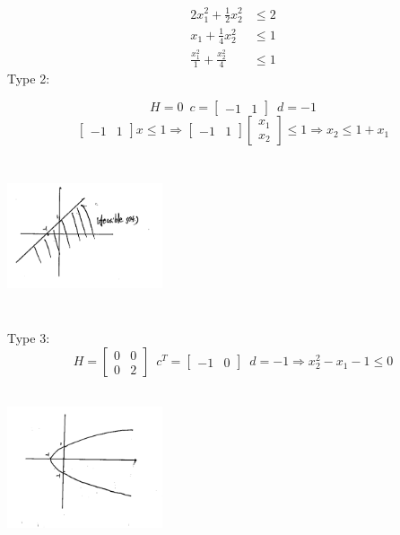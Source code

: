 \begin{align*}
2x_1^2 + \frac{1}{2}x_2^2 &\leq 2\\
x_1 + \frac{1}{4}x_2^2 &\leq 1\\
\frac{x_1^2}{1} + \frac{x_2^2}{4} &\leq 1
\end{align*}
Type 2:

\begin{equation*}
H=0\,\,\,c = \begin{bmatrix}
-1 & 1
\end{bmatrix}\,\,\,
d = -1
\end{equation*}
\begin{equation*}
\begin{bmatrix}
-1 & 1
\end{bmatrix}x\leq 1\Rightarrow
\begin{bmatrix}
-1 & 1
\end{bmatrix}
\begin{bmatrix}
x_1\\
x_2
\end{bmatrix}\leq 1\Rightarrow x_2\leq 1 + x_1
\end{equation*}

\begin{marginfigure}
	\centering
	\includegraphics[width=1.8in,height=1.8in]{figures/ch07/figure1021_2.png}
\end{marginfigure}

Type 3:
\begin{equation*}
H=\begin{bmatrix}
0 &0\\
0&2
\end{bmatrix}\,\,\,c^T = \begin{bmatrix}
-1 & 0
\end{bmatrix}\,\,\,
d = -1 \Rightarrow x^2_2 - x_1 - 1\leq 0
\end{equation*}

\begin{marginfigure}
	\centering
	\includegraphics[width=1.8in,height=1.8in]{figures/ch07/figure1021_3.png}
\end{marginfigure}

